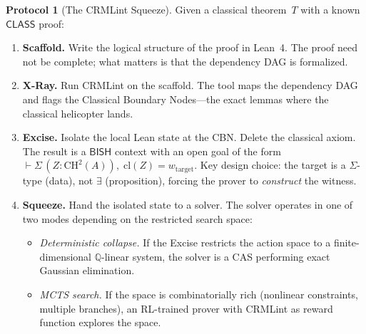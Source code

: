 \documentclass[11pt]{article}
\theoremstyle{plain}
\theoremstyle{definition}
\newtheorem{protocol}[theorem]{Protocol}
\theoremstyle{remark}
\newcommand{\Q}{\mathbb{Q}}
\newcommand{\CH}{\mathrm{CH}}
\newcommand{\cl}{\mathrm{cl}}
\newcommand{\BISH}{\mathsf{BISH}}
\newcommand{\CLASS}{\mathsf{CLASS}}
\begin{document}
\begin{protocol}[The CRMLint Squeeze]\label{prot:squeeze}
Given a classical theorem~$T$ with a known $\CLASS$ proof:
\begin{enumerate}
\item \textbf{Scaffold.} Write the logical structure of the proof
  in Lean~4.  The proof need not be complete; what matters is that
  the dependency DAG is formalized.
\item \textbf{X-Ray.} Run CRMLint on the scaffold.  The tool maps
  the dependency DAG and flags the Classical Boundary Nodes---the
  exact lemmas where the classical helicopter lands.
\item \textbf{Excise.} Isolate the local Lean state at the CBN.
  Delete the classical axiom.  The result is a $\BISH$ context
  with an open goal of the form
  $\vdash \Sigma\,(Z : \CH^2(A)),\; \cl(Z) = w_{\mathrm{target}}$.
  Key design choice: the target is a $\Sigma$-type (data), not
  $\exists$ (proposition), forcing the prover to \emph{construct}
  the witness.
\item \textbf{Squeeze.} Hand the isolated state to a solver.
  The solver operates in one of two modes depending on the
  restricted search space:
  \begin{itemize}[nosep]
  \item \emph{Deterministic collapse.} If the Excise restricts
    the action space to a finite-dimensional $\Q$-linear system,
    the solver is a CAS performing exact Gaussian elimination.
  \item \emph{MCTS search.} If the space is combinatorially rich
    (nonlinear constraints, multiple branches), an RL-trained
    prover with CRMLint as reward function explores the space.
  \end{itemize}
\end{enumerate}
\end{protocol}
\end{document}
